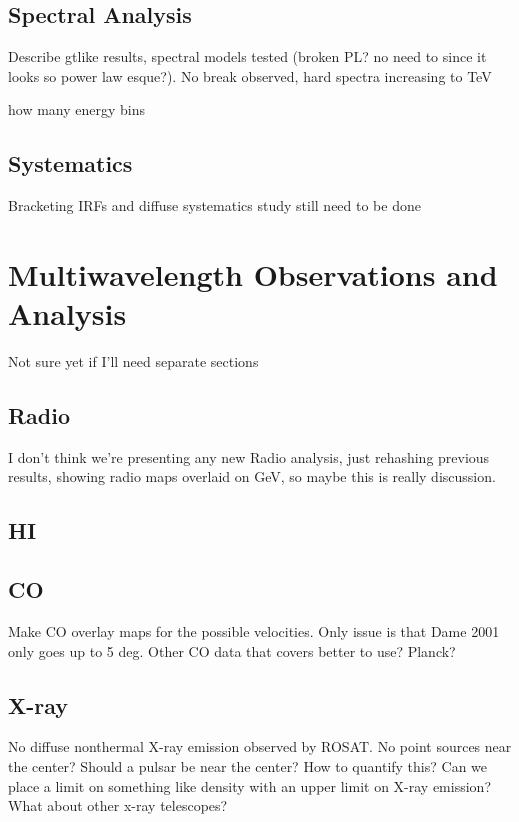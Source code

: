 \documentclass[preprint2]{aastex}
\begin{document}
\subsection{\label{sec:LATspec}Spectral Analysis}
Describe gtlike  results, spectral models tested (broken PL? no need to since it looks so power law esque?). No break observed, hard spectra increasing to TeV

how many energy bins
\subsection{\label{sec:LATsys}Systematics}
Bracketing IRFs and diffuse systematics study still need to be done


%
%

\section{\label{sec:Multiwave}Multiwavelength  Observations and  Analysis }
Not sure yet if I'll need separate sections
\subsection{\label{sec:Radio}Radio}
I don't think we're presenting any new Radio analysis, just rehashing previous results, showing radio maps overlaid on GeV, so maybe this is really discussion.
\citep{Gao14}
\subsection{\label{sec:HI}HI}
\subsection{\label{sec:CO}CO}
Make CO overlay maps for the possible velocities. Only issue is that Dame 2001 only goes up to 5 deg. Other CO data that covers better to use? Planck?
\subsection{\label{sec:Xray}X-ray}
No diffuse nonthermal X-ray emission observed by ROSAT. No point sources near the center? Should a pulsar be near the center? How to quantify this? Can we place a limit on something like density with an upper limit on X-ray emission? What about other x-ray telescopes?
\end{document}
